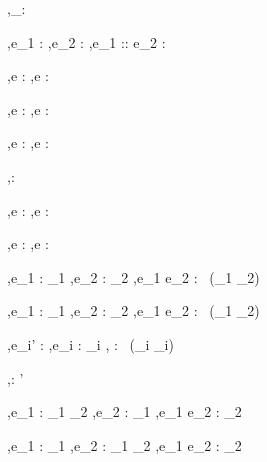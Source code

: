   { }
  {\Gamma,\Sigma \infers [\ ]_\tau : \List \tau}

  {\Gamma,\Sigma \infers e_1 : \tau \Quad
   \Gamma,\Sigma \infers e_2 : \List \tau}
  {\Gamma,\Sigma \infers e_1 :: e_2 : \List \tau}

  {\Gamma,\Sigma \infers e : \List\tau}
  {\Gamma,\Sigma \infers \Head e : \tau}

    {\Gamma,\Sigma \infers e : \List\tau}
    {\Gamma,\Sigma \infers \Tail e : \List\tau}


  {\Gamma,\Sigma \infers e : \tau}
  {\Gamma,\Sigma \infers \Done e : \Task\ }

  {}
  {\Gamma,\Sigma \infers \Enter \beta : \Task\ }

  {\Gamma,\Sigma \infers e : \beta}
  {\Gamma,\Sigma \infers \Update e : \Task\ }

  {\Gamma,\Sigma \infers e : \beta}
  {\Gamma,\Sigma \infers \View e : \Task\ }



  {\Gamma,\Sigma \infers e_1 : \Task \rho_1 \Quad
   \Gamma,\Sigma \infers e_2 : \Task \rho_2}
  {\Gamma,\Sigma \infers e_1 \Pair e_2 : \Task\ (\rho_1 \uplus \rho_2)}

  {\Gamma,\Sigma \infers e_1 : \Task \rho_1 \Quad
   \Gamma,\Sigma \infers e_2 : \Task \rho_2}
  {\Gamma,\Sigma \infers e_1 \Choose e_2 : \Task\ (\rho_1 \cap \rho_2)}

  { \Quad
   \Gamma,\Sigma \infers e_i' : \Bool \Quad
   \Gamma,\Sigma \infers e_i : \Task \rho_i}
  {\Gamma,\Sigma \infers \When {} : \Task\ (\bigcap_i \rho_i)}

  {}
  {\Gamma,\Sigma \infers \Fail : \Task \rho'}


  {\Gamma,\Sigma \infers e_1 : \rho_1 \to \rho_2 \Quad
   \Gamma,\Sigma \infers e_2 : \Task \rho_1}
  {\Gamma,\Sigma \infers e_1 \Trans e_2 : \Task \rho_2}

  {\Gamma,\Sigma \infers e_1 : \Task \rho_1 \Quad
   \Gamma,\Sigma \infers e_2 : \rho_1 \to \Task \rho_2}
  {\Gamma,\Sigma \infers e_1 \Step e_2 : \Task \rho_2}

